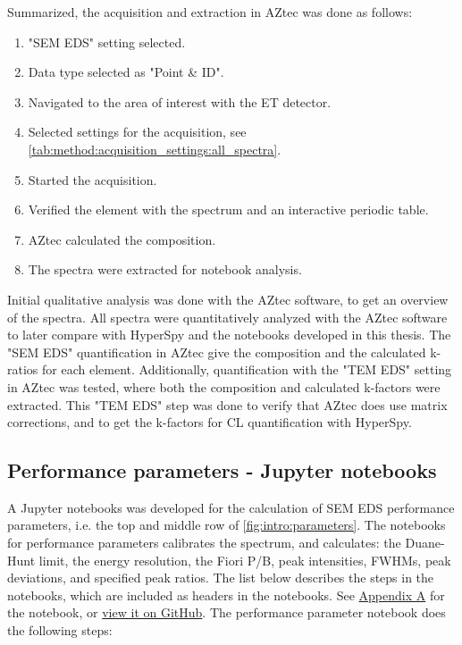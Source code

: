 Summarized, the acquisition and extraction in AZtec was done as follows:
\begin{enumerate}
    \item "SEM EDS" setting selected.
    \item Data type selected as "Point \& ID".
    \item Navigated to the area of interest with the ET detector.
    \item Selected settings for the acquisition, see \cref{tab:method:acquisition_settings:all_spectra}.
    \item Started the acquisition.
    \item Verified the element with the spectrum and an interactive periodic table.
    \item AZtec calculated the composition.
    \item The spectra were extracted for notebook analysis.
\end{enumerate}


Initial qualitative analysis was done with the AZtec software, to get an overview of the spectra.
All spectra were quantitatively analyzed with the AZtec software to later compare with HyperSpy and the notebooks developed in this thesis.
The "SEM EDS" quantification in AZtec give the composition and the calculated k-ratios for each element.
Additionally, quantification with the "TEM EDS" setting in AZtec was tested, where both the composition and calculated k-factors were extracted.
This "TEM EDS" step was done to verify that AZtec does use matrix corrections, and to get the k-factors for CL quantification with HyperSpy.






\subsection{Performance parameters - Jupyter notebooks}
\label{method:data_treatment:notebook}

A Jupyter notebooks was developed for the calculation of SEM EDS performance parameters, i.e. the top and middle row of \cref{fig:intro:parameters}.
The notebooks for performance parameters calibrates the spectrum, and calculates: the Duane-Hunt limit, the energy resolution, the Fiori P/B, peak intensities, FWHMs, peak deviations, and specified peak ratios.
The list below describes the steps in the notebooks, which are included as headers in the notebooks.
See \hyperref[appendix:performance]{Appendix A} for the notebook, or \href{https://github.com/brynjarmorka/sem-eds-qc/blob/main/healthcheck.ipynb}{view it on GitHub}.
The performance parameter notebook does the following steps:

